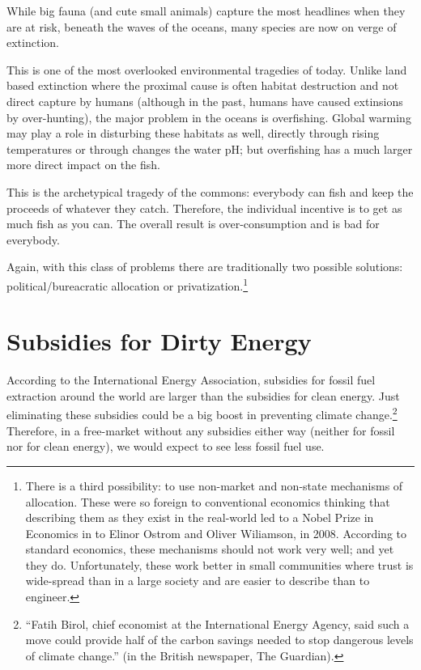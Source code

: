 While big fauna (and cute small animals) capture the most headlines when they
are at risk, beneath the waves of the oceans, many species are now on verge of
extinction.

This is one of the most overlooked environmental tragedies of today. Unlike
land based extinction where the proximal cause is often habitat destruction and
not direct capture by humans (although in the past, humans have caused
extinsions by over-hunting), the major problem in the oceans is overfishing.
Global warming may play a role in disturbing these habitats as well, directly
through rising temperatures or through changes the water pH; but overfishing
has a much larger more direct impact on the fish.

This is the archetypical tragedy of the commons: everybody can fish and keep
the proceeds of whatever they catch. Therefore, the individual incentive is to
get as much fish as you can. The overall result is over-consumption and is bad
for everybody.

Again, with this class of problems there are traditionally two possible
solutions: political/bureacratic allocation or privatization.\footnote{There
is a third possibility: to use non-market and non-state mechanisms of
allocation. These were so foreign to conventional economics thinking that
describing them as they exist in the real-world led to a Nobel Prize in
Economics in to Elinor Ostrom and Oliver Wiliamson, in 2008. According to
standard economics, these mechanisms should not work very well; and yet they
do. Unfortunately, these work better in small communities where trust is
wide-spread than in a large society and are easier to describe than to
engineer.}

\section{Subsidies for Dirty Energy}

According to the International Energy Association, subsidies for fossil fuel
extraction around the world are larger than the subsidies for clean energy.
Just eliminating these subsidies could be a big boost in preventing climate
change.\footnote{``Fatih Birol, chief
economist at the International Energy Agency, said such a move could
provide half of the carbon savings needed to stop dangerous levels of climate
change.'' (in the British newspaper, The Guardian).%
} Therefore, in a free-market without any subsidies either way (neither for
fossil nor for clean energy), we would expect to see less fossil fuel use.

